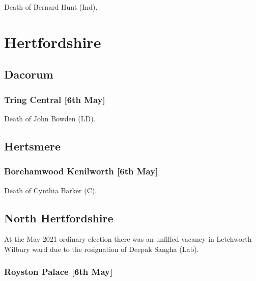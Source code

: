 \documentclass[a4paper,openany]{book}
\begin{document}
\begin{resultsiii}

Death of Bernard Hunt (Ind).

\section{Hertfordshire}

\subsection*{Dacorum}

\subsubsection*{Tring Central \hspace*{\fill}\nolinebreak[1]%
	\enspace\hspace*{\fill}
	[6th May]}


Death of John Bowden (LD).

\subsection*{Hertsmere}

\subsubsection*{Borehamwood Kenilworth \hspace*{\fill}\nolinebreak[1]%
	\enspace\hspace*{\fill}
	[6th May]}


Death of Cynthia Barker (C).

\subsection*{North Hertfordshire}

At the May 2021 ordinary election there was an unfilled vacancy in Letchworth Wilbury ward due to the resignation of Deepak Sangha (Lab).

\subsubsection*{Royston Palace \hspace*{\fill}\nolinebreak[1]%
	\enspace\hspace*{\fill}
	[6th May]}


\end{resultsiii}
\end{document}
